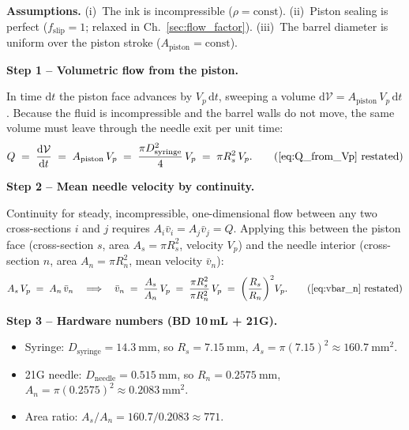 \documentclass[11pt,a4paper]{article}
\begin{document}
\begin{derivationbox}[title={DERIVATION --- Mass balance: $V_p\to Q\to\bar v_n$}]
\textbf{Assumptions.}
(i)~The ink is incompressible ($\rho=\mathrm{const}$).
(ii)~Piston sealing is perfect ($f_\mathrm{slip}=1$; relaxed in
Ch.~\ref{sec:flow_factor}).
(iii)~The barrel diameter is uniform over the piston stroke
($A_\mathrm{piston}=\mathrm{const}$).

\medskip\noindent\textbf{Step 1 -- Volumetric flow from the piston.}

In time $\mathrm{d}t$ the piston face advances by $V_p\,\mathrm{d}t$,
sweeping a volume $\mathrm{d}\mathcal{V}=A_\mathrm{piston}\,V_p\,\mathrm{d}t$.
Because the fluid is incompressible and the barrel walls do not move, the
same volume must leave through the needle exit per unit time:
\begin{equation}
Q \;=\; \frac{\mathrm{d}\mathcal{V}}{\mathrm{d}t}
  \;=\; A_\mathrm{piston}\,V_p
  \;=\; \frac{\pi D_\mathrm{syringe}^2}{4}\,V_p
  \;=\; \pi R_s^2\,V_p.
\tag{\ref{eq:Q_from_Vp} restated}
\end{equation}

\noindent\textbf{Step 2 -- Mean needle velocity by continuity.}

Continuity for steady, incompressible, one-dimensional flow between any two
cross-sections $i$ and $j$ requires $A_i\bar v_i = A_j\bar v_j = Q$.
Applying this between the piston face (cross-section $s$, area
$A_s=\pi R_s^2$, velocity $V_p$) and the needle interior (cross-section
$n$, area $A_n=\pi R_n^2$, mean velocity $\bar v_n$):
\begin{equation}
A_s\,V_p \;=\; A_n\,\bar v_n
\quad\Longrightarrow\quad
\bar v_n \;=\; \frac{A_s}{A_n}\,V_p
             \;=\; \frac{\pi R_s^2}{\pi R_n^2}\,V_p
             \;=\; \left(\frac{R_s}{R_n}\right)^2\!V_p.
\tag{\ref{eq:vbar_n} restated}
\end{equation}

\noindent\textbf{Step 3 -- Hardware numbers (BD 10\,mL + 21G).}

\begin{itemize}[leftmargin=1.6em,itemsep=1pt]
  \item Syringe: $D_\mathrm{syringe}=\SI{14.3}{\mm}$,
    so $R_s=\SI{7.15}{\mm}$,
    $A_s=\pi(7.15)^2\approx\SI{160.7}{\mm^2}$.
  \item 21G needle: $D_\mathrm{needle}=\SI{0.515}{\mm}$,
    so $R_n=\SI{0.2575}{\mm}$,
    $A_n=\pi(0.2575)^2\approx\SI{0.2083}{\mm^2}$.
  \item Area ratio: $A_s/A_n = 160.7/0.2083 \approx 771$.
\end{itemize}


\end{derivationbox}
\end{document}
